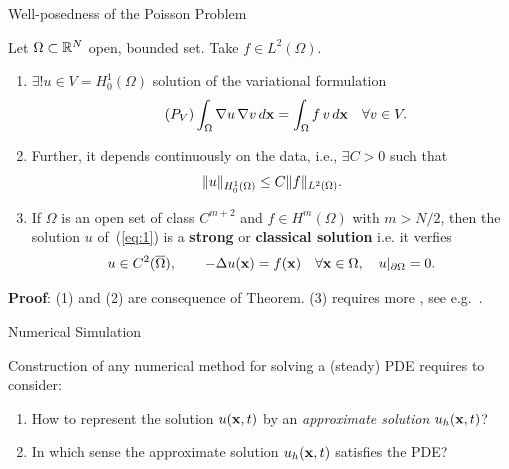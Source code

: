 \begin{frame}{Well-posedness of the Poisson Problem}
  \begin{theorem}
    Let $\Omega \subset \Rset^N$ open, bounded set. Take $f\in L^2(\Omega)$.
    \begin{enumerate}
    \item \alert{$\exists! u \in V=H_0^1(\Omega)$ solution} of the variational formulation
      \begin{equation}
        \tag{\ensuremath{P_V}}
        \int_\Omega \grad u \, \grad v \,d\xx = \int_\Omega f\, v \, d\xx \quad \forall v\in V.
        \label{eq:1}
      \end{equation}
    \item Further, it \alert{depends continuously on the data}, i.e., $\exists C>0$ such that
      $$
      \norm[H_0^1(\Omega)]{u} \le C \norm[L^2(\Omega)]{f}.
      $$
    \item If $\Omega$ is an open set of class $C^{m+2}$ and
      $f\in H^m(\Omega)$ with $m>N/2$, then the solution $u$
      of~(\ref{eq:1}) is a \alert{\textbf{strong} or \textbf{classical solution}} i.e. it verfies
      $$
      u\in C^2(\overline\Omega), \qquad -\Delta u(\xx) = f(\xx) \quad \forall \xx\in\Omega, \quad u|_{\partial\Omega}=0.
      $$
    \end{enumerate}
  \end{theorem}
  \scriptsize \textbf{Proof}: (1) and (2) are consequence of
   Theorem. (3) requires more , see e.g.~\cite{brezis:2017,allaire:2007}.
\end{frame}

\begin{frame}{Numerical Simulation}

Construction of any numerical method for solving a (steady) PDE requires to consider:

\bigskip

\begin{enumerate}
  \setlength\itemsep{1.2em}
\item How to represent the solution $u(\xx,t)$ by an
  \textit{approximate solution} $u_h(\xx,t)$?
\item In which sense the approximate solution $u_h (\xx,t)$
  satisfies the PDE?
\end{enumerate}
\end{frame}

